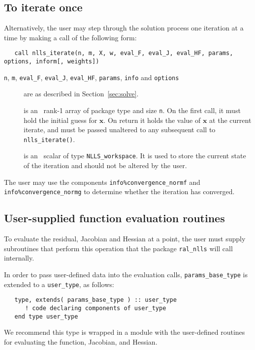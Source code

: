 \documentclass{spec}
\begin{document}
\subsection{To iterate once}
\label{sec:iterate}
Alternatively, the user may step through the solution process one iteration at
a time by making a call of the following form:

\begin{verbatim}
   call nlls_iterate(n, m, X, w, eval_F, eval_J, eval_HF, params, options, inform[, weights])
\end{verbatim}

\begin{description}

\item[\texttt{n}, \texttt{m}, \texttt{eval\_F}, \texttt{eval\_J}, \texttt{eval\_HF}, \texttt{params}, \texttt{info} and \texttt{options}] are as described in Section~\ref{sec:solve}.

 is an \intentinout\  rank-1 array of package type
and size {\tt n}.  On the first call, it must hold the initial guess for
$\bm x$. On return it holds the value of $\bm x$ at the current iterate, and
must be passed unaltered to any subsequent call to \texttt{nlls\_iterate()}.

 is an \intentinout\ scalar of type \texttt{NLLS\_workspace}. It is used
to store the current state of the iteration and should not be altered by the
user.

\end{description}

The user may use the components \texttt{info\%convergence\_normf} and
\texttt{info\%convergence\_normg} to determine whether the iteration has
converged.

\subsection{User-supplied function evaluation routines}
\label{sec::function_eval}
To evaluate the residual, Jacobian and Hessian at a point, the user
must supply subroutines that perform this operation that the package
{\tt ral\_nlls} will call internally.

In order to pass user-defined data into the evaluation calls, {\tt params\_base\_type} is extended to a {\tt user\_type}, as follows:
\begin{verbatim}
   type, extends( params_base_type ) :: user_type
      ! code declaring components of user_type
   end type user_type
\end{verbatim}
We recommend this type is wrapped in a module with the user-defined routines
for evaluating the function, Jacobian, and Hessian.
\end{document}
